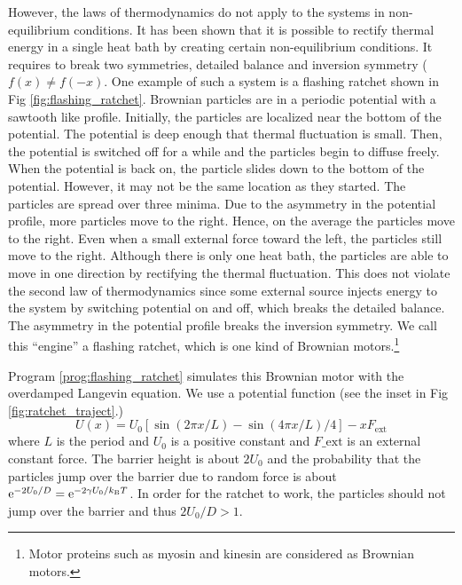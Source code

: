 However, the laws of thermodynamics do not apply to the systems in non-equilibrium conditions.  It has been shown that it is possible to rectify thermal energy in a single heat bath by creating certain non-equilibrium conditions. It requires to break two symmetries, detailed balance and inversion symmetry ($f(x) \ne f(-x)$.
One example of such a system is a flashing ratchet\cite{ratchet-sciam,ratchet-phystoday} shown in Fig \ref{fig:flashing_ratchet}.
Brownian particles are in a periodic potential with a sawtooth like profile.  Initially, the particles are localized near the bottom of the potential.  The potential is deep enough that thermal fluctuation is small.  Then, the potential is switched off for a while and the particles begin to diffuse freely.  When the potential is back on, the particle slides down to the bottom of the potential.  However, it may not be the same location as they started.  The particles are spread over three minima.  Due to the asymmetry in the potential profile, more particles move to the right.  Hence, on the average the particles move to the right.  Even when a small external force toward the left, the particles still move to the right.  Although there is only one heat bath, the particles are able to move in one direction by rectifying the thermal fluctuation.  This does not violate the second law of thermodynamics since some external source injects energy to the system by switching potential on and off, which breaks the detailed balance.  The asymmetry in the potential profile breaks the inversion symmetry.  We call this ``engine''  a flashing ratchet, which is one kind of Brownian motors.\footnote{Motor proteins such as myosin and kinesin are considered as Brownian motors.}

Program \ref{prog:flashing_ratchet} simulates this Brownian motor with the overdamped Langevin equation.  We use a potential function (see the inset in Fig \ref{fig:ratchet_traject}.)
\begin{equation}\label{eq:ratchet_potential}
U(x) = U_0 \left [ \sin(2 \pi x/L) - \sin(4 \pi x/L)/4 \right ] - x F_\text{ext}
\end{equation}
where $L$ is the period and $U_0$ is a positive constant and $F\_\text{ext}$ is an external constant force.  The  barrier height is about $2U_0$ and the probability that the particles jump over the barrier due to random force is about $\text{e}^{-2U_0/D} = \text{e}^{-2\gamma U_0/k_\text{B} T}$.  In order for the ratchet to work, the particles should not jump over the barrier and thus $2 U_0/D > 1$.

